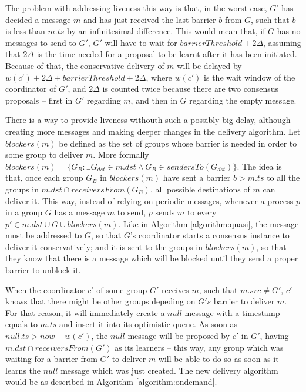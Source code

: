 \documentclass[times, 10pt]{article}
\begin{document}
The problem with addressing liveness this way is that, in the worst case, $G'$ has decided a message $m$ and has just received the last barrier $b$ from $G$, such that $b$ is less than $m.ts$ by an infinitesimal difference. This would mean that, if $G$ has no messages to send to $G'$, $G'$ will have to wait for $barrierThreshold + 2\Delta$, assuming that $2\Delta$ is the time needed for a proposal to be learnt after it has been initiated. Because of that, the conservative delivery of $m$ will be delayed by $w(c') + 2\Delta + barrierThreshold + 2\Delta$, where $w(c')$ is the wait window of the coordinator of $G'$, and $2\Delta$ is counted twice because there are two consensus proposals -- first in $G'$ regarding $m$, and then in $G$ regarding the empty message.

There is a way to provide liveness withouth such a possibly big delay, although creating more messages and making deeper changes in the delivery algorithm. Let $blockers(m)$ be defined as the set of groups whose barrier is needed in order to some group to deliver $m$. More formally $blockers(m) = \{G_B : \exists G_{dst} \in m.dst \wedge G_B \in sendersTo(G_{dst})\}$. The idea is that, once each group $G_B$ in $blockers(m)$ have sent a barrier $b > m.ts$ to all the groups in $m.dst \cap receiversFrom(G_B)$, all possible destinations of $m$ can deliver it. This way, instead of relying on periodic messages, whenever a process $p$ in a group $G$ has a message $m$ to send, $p$ sends $m$ to every $p' \in m.dst \cup G \cup blockers(m)$. Like in Algorithm \ref{algorithm:quasi}, the message must be addressed to $G$, so that $G$'s coordinator starts a consensus instance to deliver it conservatively; and it is sent to the groups in $blockers(m)$, so that they know that there is a message which will be blocked until they send a proper barrier to unblock it.

When the coordinator $c'$ of some group $G'$ receives $m$, such that $m.src \neq G'$, $c'$ knows that there might be other groups depeding on $G's$ barrier to deliver $m$. For that reason, it will immediately create a $null$ message with a timestamp equals to $m.ts$ and insert it into its optimistic queue. As soon as $null.ts > now - w(c')$, the $null$ message will be proposed by $c'$ in $G'$, having \mbox{$m.dst \cap receiversFrom(G')$} as its learners -- this way, any group which was waiting for a barrier from $G'$ to deliver $m$ will be able to do so as soon as it learns the $null$ message which was just created. The new delivery algorithm would be as described in Algorithm {\ref{algorithm:ondemand}}.
\end{document}
